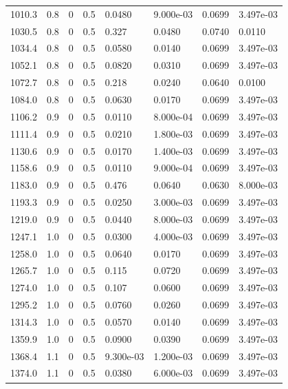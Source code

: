\documentclass[preview]{standalone}
\begin{document}
{{{\begin{tabular}{L{1.2cm}C{1.2cm} C{0.3cm}C{0.5cm} C{1.4cm}C{1.4cm} C{1.4cm}C{1.4cm}}
  1010.3  &   0.8  & 0     & 0.5 &  0.0480  & 9.000e-03  & 0.0699 &  3.497e-03   \\ 
  1030.5  &   0.8  & 0     & 0.5 &  0.327  & 0.0480  & 0.0740 &  0.0110   \\ 
  1034.4  &   0.8  & 0     & 0.5 &  0.0580  & 0.0140  & 0.0699 &  3.497e-03   \\ 
  1052.1  &   0.8  & 0     & 0.5 &  0.0820  & 0.0310  & 0.0699 &  3.497e-03   \\ 
  1072.7  &   0.8  & 0     & 0.5 &  0.218  & 0.0240  & 0.0640 &  0.0100   \\ 
  1084.0  &   0.8  & 0     & 0.5 &  0.0630  & 0.0170  & 0.0699 &  3.497e-03   \\ 
  1106.2  &   0.9  & 0     & 0.5 &  0.0110  & 8.000e-04  & 0.0699 &  3.497e-03   \\ 
  1111.4  &   0.9  & 0     & 0.5 &  0.0210  & 1.800e-03  & 0.0699 &  3.497e-03   \\ 
  1130.6  &   0.9  & 0     & 0.5 &  0.0170  & 1.400e-03  & 0.0699 &  3.497e-03   \\ 
  1158.6  &   0.9  & 0     & 0.5 &  0.0110  & 9.000e-04  & 0.0699 &  3.497e-03   \\ 
  1183.0  &   0.9  & 0     & 0.5 &  0.476  & 0.0640  & 0.0630 &  8.000e-03   \\ 
  1193.3  &   0.9  & 0     & 0.5 &  0.0250  & 3.000e-03  & 0.0699 &  3.497e-03   \\ 
  1219.0  &   0.9  & 0     & 0.5 &  0.0440  & 8.000e-03  & 0.0699 &  3.497e-03   \\ 
  1247.1  &   1.0  & 0     & 0.5 &  0.0300  & 4.000e-03  & 0.0699 &  3.497e-03   \\ 
  1258.0  &   1.0  & 0     & 0.5 &  0.0640  & 0.0170  & 0.0699 &  3.497e-03   \\ 
  1265.7  &   1.0  & 0     & 0.5 &  0.115  & 0.0720  & 0.0699 &  3.497e-03   \\ 
  1274.0  &   1.0  & 0     & 0.5 &  0.107  & 0.0600  & 0.0699 &  3.497e-03   \\ 
  1295.2  &   1.0  & 0     & 0.5 &  0.0760  & 0.0260  & 0.0699 &  3.497e-03   \\ 
  1314.3  &   1.0  & 0     & 0.5 &  0.0570  & 0.0140  & 0.0699 &  3.497e-03   \\ 
  1359.9  &   1.0  & 0     & 0.5 &  0.0900  & 0.0390  & 0.0699 &  3.497e-03   \\ 
  1368.4  &   1.1  & 0     & 0.5 &  9.300e-03  & 1.200e-03  & 0.0699 &  3.497e-03   \\ 
  1374.0  &   1.1  & 0     & 0.5 &  0.0380  & 6.000e-03  & 0.0699 &  3.497e-03   \\ 

\end{tabular}}}}
\end{document}
